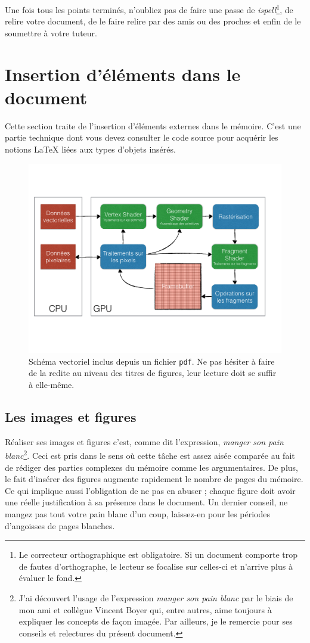 \documentclass[a4paper, 12pt]{book}
\begin{document}
Une fois tous les points terminés, n'oubliez pas de faire une passe de
\emph{ispell}\footnote{Le correcteur orthographique est
  obligatoire. Si un document comporte trop de fautes d'orthographe,
  le lecteur se focalise sur celles-ci et n'arrive plus à évaluer le
  fond.}, de relire votre document, de le faire relire par des amis ou
des proches et enfin de le soumettre à votre tuteur.
\section{Insertion d'éléments dans le document}
Cette section traite de l'insertion d'éléments externes dans le
mémoire. C'est une partie technique dont vous devez consulter le code
source pour acquérir les notions \LaTeX{} liées aux types d'objets
insérés.
\begin{figure}[htbp]
  \centering
  \includegraphics[width=0.5\linewidth]{fig/pipeline.pdf}
  \caption{Schéma vectoriel inclus depuis un fichier \texttt{pdf}. Ne
    pas hésiter à faire de la redite au niveau des titres de
    figures, leur lecture doit se suffir à elle-même.\label{fig-vect}}
\end{figure}


\subsection{Les images et figures}
Réaliser ses images et figures c'est, comme dit l'expression,
\emph{manger son pain blanc}\footnote{J'ai découvert l'usage de
  l'expression \emph{manger son pain blanc} par le biais de mon ami et
  collègue Vincent Boyer qui, entre autres, aime toujours à expliquer
  les concepts de façon imagée. Par ailleurs, je le remercie pour ses
  conseils et relectures du présent document.}. Ceci est pris dans le
sens où cette tâche est assez aisée comparée au fait de rédiger des
parties complexes du mémoire comme les argumentaires. De plus, le fait
d'insérer des figures augmente rapidement le nombre de pages du
mémoire. Ce qui implique aussi l'obligation de ne pas en abuser ;
chaque figure doit avoir une réelle justification à sa présence dans
le document. Un dernier conseil, ne mangez pas tout votre pain blanc
d'un coup, laissez-en pour les périodes d'angoisses de pages blanches.
\end{document}
